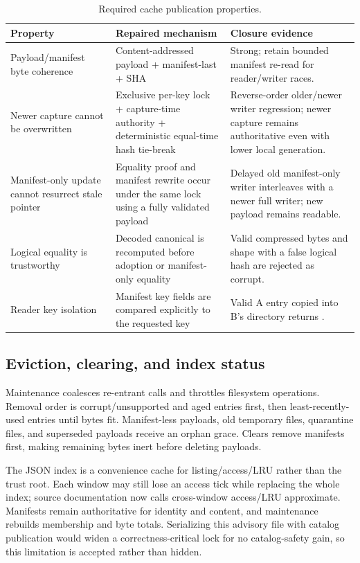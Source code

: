 \documentclass[11pt]{article}
\newcommand{\code}[1]{\texttt{\detokenize{#1}}}
\begin{document}
\begin{table}[H]
\centering
\small
\caption{Required cache publication properties.}
\label{tab:cachepublication}
\begin{tabularx}{\textwidth}{@{}p{}p{}X@{}}
\toprule
\textbf{Property} & \textbf{Repaired mechanism} & \textbf{Closure evidence}\\
\midrule
Payload/manifest byte coherence & Content-addressed payload + manifest-last + SHA & Strong; retain bounded manifest re-read for reader/writer races.\\
Newer capture cannot be overwritten & Exclusive per-key lock + capture-time authority + deterministic equal-time hash tie-break & Reverse-order older/newer writer regression; newer capture remains authoritative even with lower local generation.\\
Manifest-only update cannot resurrect stale pointer & Equality proof and manifest rewrite occur under the same lock using a fully validated payload & Delayed old manifest-only writer interleaves with a newer full writer; new payload remains readable.\\
Logical equality is trustworthy & Decoded canonical \code{contentHash} is recomputed before adoption or manifest-only equality & Valid compressed bytes and shape with a false logical hash are rejected as corrupt.\\
Reader key isolation & Manifest key fields are compared explicitly to the requested key & Valid A entry copied into B's directory returns \code{keyMismatch}.\\
\bottomrule
\end{tabularx}
\end{table}

\subsection{Eviction, clearing, and index status}

Maintenance coalesces re-entrant calls and throttles filesystem operations. Removal order is corrupt/unsupported and aged entries first, then least-recently-used entries until bytes fit. Manifest-less payloads, old temporary files, quarantine files, and superseded payloads receive an orphan grace. Clears remove manifests first, making remaining bytes inert before deleting payloads.

The JSON index is a convenience cache for listing/access/LRU rather than the trust root. Each window may still lose an access tick while replacing the whole index; source documentation now calls cross-window access/LRU approximate. Manifests remain authoritative for identity and content, and maintenance rebuilds membership and byte totals. Serializing this advisory file with catalog publication would widen a correctness-critical lock for no catalog-safety gain, so this limitation is accepted rather than hidden.
\end{document}
